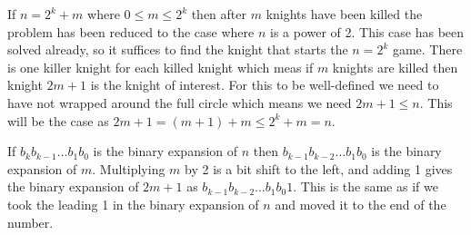 If $n = 2^k + m$ where $0 \leq m \le 2^k$ then after $m$ knights have been killed the problem has been reduced to the case where $n$ is a power of 2. This case has been solved already, so it suffices to find the knight that starts the $n = 2^k$ game. There is one killer knight for each killed knight which meas if $m$ knights are killed then knight $2m + 1$ is the knight of interest. For this to be well-defined we need to have not wrapped around the full circle which means we need $2m + 1 \leq n$. This will be the case as $2m + 1 = (m + 1) + m \leq 2^k + m = n$.

If $b_k b_{k-1} \dots b_1 b_0$ is the binary expansion of $n$ then $b_{k-1} b_{k-2} \dots b_1 b_0$ is the binary expansion of $m$. Multiplying $m$ by 2 is a bit shift to the left, and adding 1 gives the binary expansion of $2m + 1$ as $b_{k-1} b_{k-2} \dots b_1 b_0 1$. This is the same as if we took the leading 1 in the binary expansion of $n$ and moved it to the end of the number.

